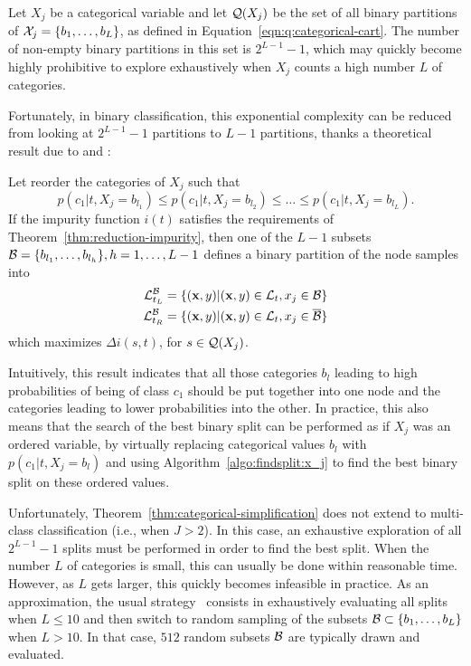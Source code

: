 Let $X_j$ be a categorical variable and let ${\cal Q}(X_j)$ be the set of all
binary partitions of ${\cal X}_j= \{ b_1, \dots, b_L \}$, as defined in
Equation~\ref{eqn:q:categorical-cart}. The number of non-empty binary
partitions in this set is $2^{L-1}-1$, which may quickly become highly
prohibitive to  explore exhaustively when $X_j$ counts a high number $L$
of categories.

Fortunately, in binary classification, this exponential complexity can be
reduced from looking at $2^{L-1}-1$ partitions to $L-1$ partitions, thanks a
theoretical result due to \citet{fisher:1958} and \citet{breiman:1984}:
\begin{theorem}\label{thm:categorical-simplification}
Let reorder the categories of $X_j$ such that
$$p(c_1|t,X_j=b_{l_1}) \leq p(c_1|t,X_j=b_{l_2}) \leq \dots \leq p(c_1|t,X_j=b_{l_L}).$$
If the impurity function $i(t)$ satisfies the requirements of Theorem~\ref{thm:reduction-impurity}, then one
of the $L-1$ subsets ${\cal B}=\{b_{l_1}, \dots, b_{l_h}\}, h=1, \dots, L-1$ defines
a binary partition of the node samples into
\begin{align*}
{\cal L}^{\cal B}_{t_L} &= \{(\mathbf{x}, y)|(\mathbf{x}, y)\in {\cal L}_t, x_j \in {\cal B}\}\\
{\cal L}^{\cal B}_{t_R} &= \{(\mathbf{x}, y)|(\mathbf{x}, y)\in {\cal L}_t, x_j \in \overline{{\cal B}}\}
\end{align*}
which maximizes $\Delta i(s, t)$, for $s \in {\cal Q}(X_j)$.
\end{theorem}
Intuitively, this result indicates that all those categories $b_l$ leading to
high probabilities of being of class $c_1$ should be put together into one node
and the categories leading to lower probabilities into the other. In practice,
this also means that the search of the best binary split can be performed as if
$X_j$ was an ordered variable, by virtually replacing categorical values $b_l$
with $p(c_1|t,X_j=b_l)$ and using Algorithm~\ref{algo:findsplit:x_j} to find
the best binary split on these ordered values.

Unfortunately, Theorem~\ref{thm:categorical-simplification} does not extend to
multi-class classification (i.e., when $J > 2$). In this case, an exhaustive
exploration of all $2^{L-1}-1$ splits must be performed in order
to find the best split.  When the number $L$ of categories is small, this can
usually be done  within reasonable time. However, as $L$ gets larger, this
quickly becomes infeasible in practice. As an approximation, the usual
strategy~\citep{liaw:2002} consists in exhaustively evaluating all splits when
$L \leq 10$ and then switch to random sampling of the subsets ${\cal B} \subset
\{ b_1, \dots, b_L \}$ when $L > 10$. In that case, $512$ random subsets ${\cal
B}$ are typically drawn and evaluated.


